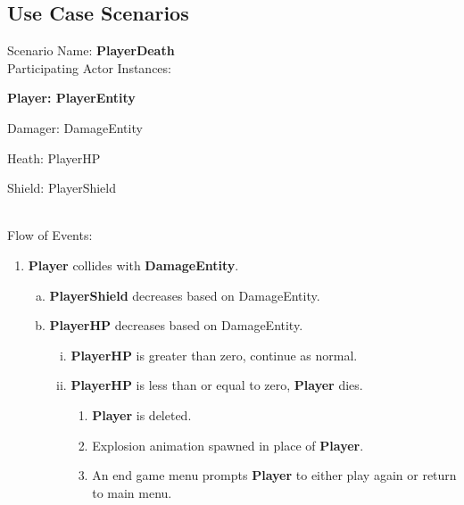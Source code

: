\documentclass[12pt]{article}       %
\begin{document}
\subsection{Use Case Scenarios} 
Scenario Name: {\bf PlayerDeath} \\
Participating Actor Instances:        \hspace{46pt} {\bf Player: PlayerEntity

					          \hspace{2.6 in}   Damager: DamageEntity 

					          \hspace{2.6in}    Heath: PlayerHP

						\hspace{2.6in}   Shield: PlayerShield} \vspace{10pt}  \\ 
Flow of Events: 
\begin{enumerate} 
\item {\bf Player }collides with {\bf DamageEntity}.
      \begin{enumerate}[a.]
       \item {\bf PlayerShield} decreases based on DamageEntity. 
       \item {\bf PlayerHP} decreases based on DamageEntity. 
                \begin{enumerate}[i.]
                 \item {\bf PlayerHP} is greater than zero, continue as normal.
                 \item{\bf PlayerHP} is less than or equal to zero, {\bf Player} dies.
                      \begin{enumerate}[1.]
                	\item {\bf Player} is deleted.
                	\item Explosion animation spawned in place of {\bf Player}.
		\item An end game menu prompts {\bf Player} to either play again or return to main menu.
		 \end{enumerate}
                \end{enumerate}
        \end{enumerate}
\end{enumerate}
\end{document}
